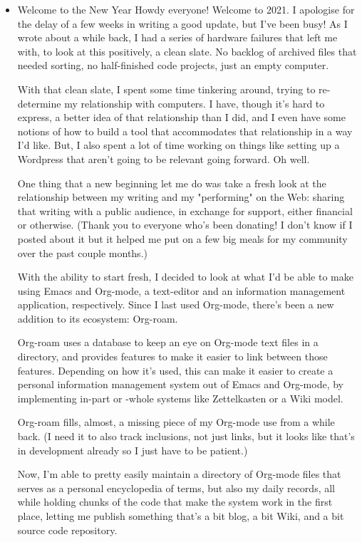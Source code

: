 \documentclass[11pt]{article}
\begin{document}
\begin{itemize}
\item Welcome to the New Year
\label{sec:org4b60886}
Howdy everyone! Welcome to 2021. I apologise for the delay of a few weeks in writing a good update, but I've been busy! As I wrote about a while back, I had a series of hardware failures that left me with, to look at this positively, a clean slate. No backlog of archived files that needed sorting, no half-finished code projects, just an empty computer.

With that clean slate, I spent some time tinkering around, trying to re-determine my relationship with computers. I have, though it's hard to express, a better idea of that relationship than I did, and I even have some notions of how to build a tool that accommodates that relationship in a way I'd like. But, I also spent a lot of time working on things like setting up a Wordpress that aren't going to be relevant going forward. Oh well.

One thing that a new beginning let me do was take a fresh look at the relationship between my writing and my "performing" on the Web: sharing that writing with a public audience, in exchange for support, either financial or otherwise. (Thank you to everyone who's been donating! I don't know if I posted about it but it helped me put on a few big meals for my community over the past couple months.)

With the ability to start fresh, I decided to look at what I'd be able to make using Emacs and Org-mode, a text-editor and an information management application, respectively. Since I last used Org-mode, there's been a new addition to its ecosystem: Org-roam.

Org-roam uses a database to keep an eye on Org-mode text files in a directory, and provides features to make it easier to link between those features. Depending on how it's used, this can make it easier to create a personal information management system out of Emacs and Org-mode, by implementing in-part or -whole systems like Zettelkasten or a Wiki model.

Org-roam fills, almost, a missing piece of my Org-mode use from a while back. (I need it to also track inclusions, not just links, but it looks like that's in development already so I just have to be patient.)

Now, I'm able to pretty easily maintain a directory of Org-mode files that serves as a personal encyclopedia of terms, but also my daily records, all while holding chunks of the code that make the system work in the first place, letting me publish something that's a bit blog, a bit Wiki, and a bit source code repository.


\end{itemize}
\end{document}
